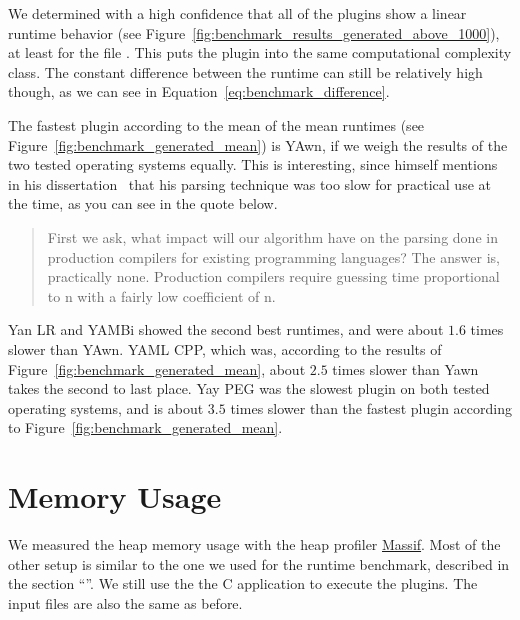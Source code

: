 We determined with a high confidence that all of the  plugins show a linear runtime behavior (see Figure~\ref{fig:benchmark_results_generated_above_1000}), at least for the file \FileGeneratedHundredThousand{}. This puts the plugin into the same computational complexity class. The constant difference between the runtime can still be relatively high though, as we can see in Equation~\ref{eq:benchmark_difference}.

The fastest plugin according to the mean of the mean runtimes (see Figure~\ref{fig:benchmark_generated_mean}) is YAwn, if we weigh the results of the two tested operating systems equally. This is interesting, since \citeauthor{earley1970efficient} himself mentions in his dissertation~\cite[p. 122]{earley1970efficient} that his parsing technique was too slow for practical use at the time, as you can see in the quote below.

\begin{quote}
  First we ask, what impact will our algorithm have on the parsing done in production compilers for existing programming languages? The answer is, practically none. Production compilers require guessing time proportional to n with a fairly low coefficient of n.
\end{quote}

Yan LR and YAMBi showed the second best runtimes, and were about $1.6$ times slower than YAwn. YAML CPP, which was, according to the results of Figure~\ref{fig:benchmark_generated_mean}, about $2.5$ times slower than Yawn takes the second to last place. Yay PEG was the slowest plugin on both tested operating systems, and is about $3.5$ times slower than the fastest plugin according to Figure~\ref{fig:benchmark_generated_mean}.

\section{Memory Usage}
\label{sec:memory_usage}

\newcommand{\FileBenchmarkMemory}{{%
\href{http://rawdata.libelektra.org/tree/master/YAML/Scripts/benchmark-memory}%
{\sh{benchmark-memory}}%
}}

We measured the heap memory usage with the heap profiler \href{http://valgrind.org/docs/manual/ms-manual.html}{Massif}. Most of the other setup is similar to the one we used for the runtime benchmark, described in the section “”. We still use the the C application \FilePluginGetSet{} to execute the plugins. The input files are also the same as before.

